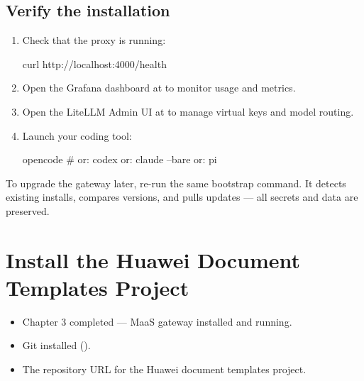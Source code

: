 \documentclass[english]{guide}
\begin{document}
\subsection{Verify the installation}

\passoapasso
\begin{enumerate}
  \item Check that the proxy is running:

  \begin{codigo}[bash]
curl http://localhost:4000/health
  \end{codigo}

  \item Open the Grafana dashboard at  to
        monitor usage and metrics.

  \item Open the LiteLLM Admin UI at  to
        manage virtual keys and model routing.

  \item Launch your coding tool:

  \begin{codigo}[bash]
opencode          # or:  codex  or:  claude --bare  or:  pi
  \end{codigo}
\end{enumerate}

\begin{dica}
To upgrade the gateway later, re-run the same bootstrap command. It detects
existing installs, compares versions, and pulls updates — all secrets and
data are preserved.
\end{dica}

\section{Install the Huawei Document Templates Project}

\begin{objetivos}

  \prerequisitos
  \begin{itemize}
    \item Chapter 3 completed — MaaS gateway installed and running.
    \item Git installed ().
    \item The repository URL for the Huawei document templates project.
  \end{itemize}
\end{objetivos}
\end{document}

